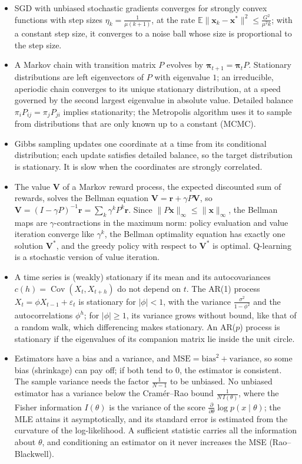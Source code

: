 \documentclass[11pt]{article}
\newcommand{\norm}[1]{\lVert #1 \rVert}
\newcommand{\E}{\mathbb{E}}
\DeclareMathOperator{\Cov}{Cov}
\theoremstyle{definition}
\theoremstyle{plain}
\theoremstyle{remark}
\begin{document}
\begin{itemize}[leftmargin=*]
    \item SGD with unbiased stochastic gradients converges for strongly convex functions with step sizes $\eta_k = \frac{1}{\mu(k + 1)}$, at the rate $\E\norm{\mathbf{x}_k - \mathbf{x}^*}^2 \leq \frac{G^2}{\mu^2k}$; with a constant step size, it converges to a noise ball whose size is proportional to the step size.
    \item A Markov chain with transition matrix $P$ evolves by $\boldsymbol{\pi}_{t+1} = \boldsymbol{\pi}_t P$. Stationary distributions are left eigenvectors of $P$ with eigenvalue $1$; an irreducible, aperiodic chain converges to its unique stationary distribution, at a speed governed by the second largest eigenvalue in absolute value. Detailed balance $\pi_i P_{ij} = \pi_j P_{ji}$ implies stationarity; the Metropolis algorithm uses it to sample from distributions that are only known up to a constant (MCMC).
    \item Gibbs sampling updates one coordinate at a time from its conditional distribution; each update satisfies detailed balance, so the target distribution is stationary. It is slow when the coordinates are strongly correlated.
    \item The value $\mathbf{V}$ of a Markov reward process, the expected discounted sum of rewards, solves the Bellman equation $\mathbf{V} = \mathbf{r} + \gamma P\mathbf{V}$, so $\mathbf{V} = (I - \gamma P)^{-1}\mathbf{r} = \sum_k \gamma^kP^k\mathbf{r}$. Since $\norm{P\mathbf{x}}_\infty \leq \norm{\mathbf{x}}_\infty$, the Bellman maps are $\gamma$-contractions in the maximum norm: policy evaluation and value iteration converge like $\gamma^k$, the Bellman optimality equation has exactly one solution $\mathbf{V}^*$, and the greedy policy with respect to $\mathbf{V}^*$ is optimal. Q-learning is a stochastic version of value iteration.
    \item A time series is (weakly) stationary if its mean and its autocovariances $c(h) = \Cov(X_t, X_{t+h})$ do not depend on $t$. The AR(1) process $X_t = \phi X_{t-1} + \varepsilon_t$ is stationary for $|\phi| < 1$, with the variance $\frac{\sigma^2}{1 - \phi^2}$ and the autocorrelations $\phi^h$; for $|\phi| \geq 1$, its variance grows without bound, like that of a random walk, which differencing makes stationary. An AR($p$) process is stationary if the eigenvalues of its companion matrix lie inside the unit circle.
    \item Estimators have a bias and a variance, and $\mathrm{MSE} = \text{bias}^2 + \text{variance}$, so some bias (shrinkage) can pay off; if both tend to $0$, the estimator is consistent. The sample variance needs the factor $\frac{1}{N - 1}$ to be unbiased. No unbiased estimator has a variance below the Cram\'er--Rao bound $\frac{1}{N\,I(\theta)}$, where the Fisher information $I(\theta)$ is the variance of the score $\frac{\partial}{\partial\theta}\log p(x \mid \theta)$; the MLE attains it asymptotically, and its standard error is estimated from the curvature of the log-likelihood. A sufficient statistic carries all the information about $\theta$, and conditioning an estimator on it never increases the MSE (Rao--Blackwell).

\end{itemize}
\end{document}
